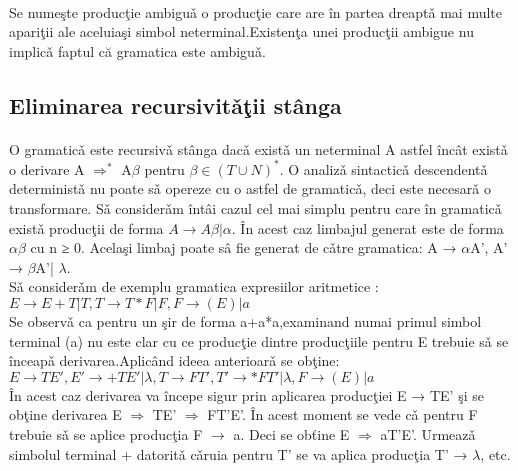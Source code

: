 \paragraph*{}
Se nume\c ste produc\c tie ambigu\v a o produc\c tie care are \^ in partea dreapt\v a mai multe apari\c tii ale aceluia\c si simbol neterminal.Existen\c ta unei produc\c tii ambigue nu implic\v a faptul că gramatica este ambigu\v a.
%
%
%
%
\subsection{Eliminarea recursivit\v a\c tii st\^ anga }
\paragraph*{}
O gramatic\v a este recursiv\v a st\^ anga dac\v a exist\v a un neterminal A astfel \^ inc\^ at exist\v a o derivare A $\Rightarrow ^{*}$ A$\beta$
pentru $\beta \in(T \cup N)^{*}$. O analiz\v a sintactic\v a descendent\v a determinist\v a nu poate s\v a opereze cu o astfel de gramatic\v a, deci este necesar\v a o transformare.
S\v a consider\v am \^ int\^ ai cazul cel mai simplu pentru care \^ in
gramatic\v a exist\v a produc\c tii de forma $A \rightarrow A\beta | \alpha$. \^In acest caz limbajul generat este de forma $\alpha \beta$ cu n ≥ 0.
Acela\c si limbaj poate s\^ a fie generat de c\v atre gramatica: A → $\alpha$A', A' → $\beta$A'| $\lambda$. 
\\
 S\v a consider\v am de exemplu gramatica expresiilor aritmetice :\\
 $ E \rightarrow E + T | T, T \rightarrow T * F | F, F \rightarrow (E) | a $
\\
 Se observ\v a ca pentru un \c sir de forma a+a*a,examinand numai primul simbol terminal (a) nu este clar cu ce produc\c tie dintre produc\c tiile pentru E trebuie s\v a se \^inceap\v a derivarea.Aplic\^ and ideea anterioar\v a se ob\c tine:\\
$ E \rightarrow T E', E' \rightarrow +TE' | \lambda, T \rightarrow FT', T' \rightarrow *FT' | \lambda, F \rightarrow (E) | a $
\\
\^In acest caz derivarea va \^incepe sigur prin aplicarea produc\c tiei Ε → TE' \c si se ob\c tine derivarea Ε $\Rightarrow$ TE' $\Rightarrow$ FT'Ε'. \^In acest moment se vede c\v a pentru F trebuie s\v a se aplice produc\c tia F $\rightarrow$ a. Deci se ob\v tine Ε $\Rightarrow$ aT'Ε'. Urmeaz\v a simbolul terminal + datorit\v a c\v aruia pentru T' se va aplica produc\c tia T' → $\lambda$, etc. 
